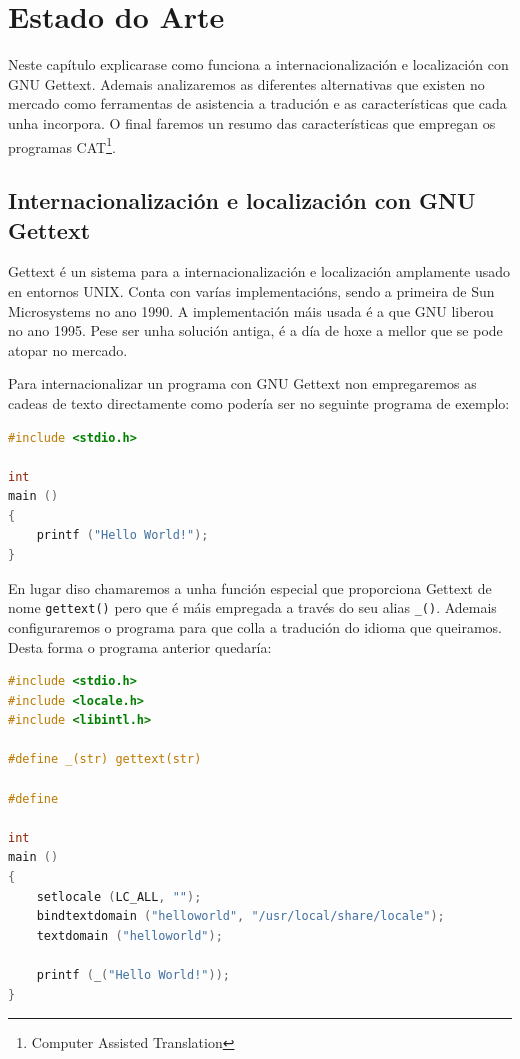 \chapter[Estado do arte]{Estado do Arte\label{estado_do_arte}}

Neste capítulo explicarase como funciona a internacionalización e localización con GNU Gettext. Ademais analizaremos as diferentes alternativas que existen no mercado como ferramentas de asistencia a tradución e as características que cada unha incorpora. O final faremos un resumo das características que empregan os programas CAT\footnote{Computer Assisted Translation}.

\section{Internacionalización e localización con GNU Gettext}
Gettext é un sistema para a internacionalización e localización amplamente usado en entornos UNIX. Conta con varías implementacións, sendo a primeira de Sun Microsystems no ano 1990. A implementación máis usada é a que GNU liberou no ano 1995. Pese ser unha solución antiga, é a día de hoxe a mellor que se pode atopar no mercado.

Para internacionalizar un programa con GNU Gettext non empregaremos as cadeas de texto directamente como podería ser no seguinte programa de exemplo:

\begin{lstlisting}[language=C,label=some-code,caption=helloworld.c (Sen Internacionalizar)]
#include <stdio.h>

int
main ()
{
    printf ("Hello World!");
}
\end{lstlisting}

En lugar diso chamaremos a unha función especial que proporciona Gettext de nome \lstinline{gettext()} pero que é máis empregada a través do seu alias \lstinline{_()}. Ademais configuraremos o programa para que colla a tradución do idioma que queiramos. Desta forma o programa anterior quedaría:

\begin{lstlisting}[language=C,label=some-code,caption=helloworld.c]
#include <stdio.h>
#include <locale.h>
#include <libintl.h>

#define _(str) gettext(str)

#define

int
main ()
{
    setlocale (LC_ALL, "");
    bindtextdomain ("helloworld", "/usr/local/share/locale");
    textdomain ("helloworld");

    printf (_("Hello World!"));
}
\end{lstlisting}

